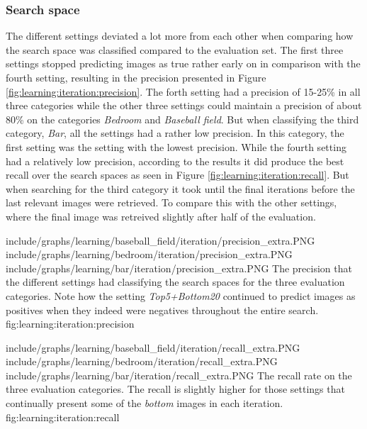 \subsubsection{Search space}
\label{sec:res:learning:iter}
The different settings deviated a lot more from each other when comparing how the search space was classified compared to the evaluation set. The first three settings stopped predicting images as true rather early on in comparison with the fourth setting, resulting in the precision presented in Figure \ref{fig:learning:iteration:precision}. The forth setting had a precision of 15-25\% in all three categories while the other three settings could maintain a precision of about 80\% on the categories \emph{Bedroom} and \emph{Baseball field}. But when classifying the third category, \emph{Bar}, all the settings had a rather low precision. In this category, the first setting was the setting with the lowest precision. While the fourth setting had a relatively low precision, according to the results it did produce the best recall over the search spaces as seen in Figure \ref{fig:learning:iteration:recall}. But when searching for the third category it took until the final iterations before the last relevant images were retrieved. To compare this with the other settings, where the final image was retreived slightly after half of the evaluation. 

\tripfigurenear
{include/graphs/learning/baseball_field/iteration/precision_extra.PNG}
{include/graphs/learning/bedroom/iteration/precision_extra.PNG}
{include/graphs/learning/bar/iteration/precision_extra.PNG}
{The precision that the different settings had classifying the search spaces for the three evaluation categories. Note how the setting \emph{Top5+Bottom20} continued to predict images as positives when they indeed were negatives throughout the entire search.}
{fig:learning:iteration:precision}

\tripfigurenear
{include/graphs/learning/baseball_field/iteration/recall_extra.PNG}
{include/graphs/learning/bedroom/iteration/recall_extra.PNG}
{include/graphs/learning/bar/iteration/recall_extra.PNG}
{The recall rate on the three evaluation categories. The recall is slightly higher for those settings that continually present some of the \emph{bottom} images in each iteration.}
{fig:learning:iteration:recall}

